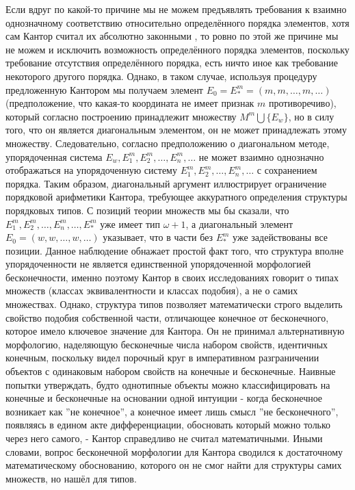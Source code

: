 \documentclass[12pt]{article}
\begin{document}
Если вдруг по какой-то причине мы не можем предъявлять требования к взаимно однозначному соответствию относительно определённого порядка элементов, хотя сам Кантор считал их абсолютно законными \cite{cantor-relation}, то ровно по этой же причине мы не можем и исключить возможность определённого порядка элементов, поскольку требование отсутствия определённого порядка, есть ничто иное как требование некоторого другого порядка. Однако, в таком случае, используя процедуру предложенную Кантором мы получаем элемент $E_0 = E^m_* = (m, m, \dots, m, \dots)$ (предположение, что какая-то координата не имеет признак $m$ противоречиво), который согласно построению принадлежит множеству $M^m \bigcup \{E_w\}$, но в силу того, что он является диагональным элементом, он не может принадлежать этому множеству. Следовательно, согласно предположению о диагональном методе, упорядоченная система $E_w, E^m_1, E^m_2, \dots, E^m_n, \dots$ не может взаимно однозначно отображаться на упорядоченную систему $E^m_1, E^m_2, \dots, E^m_n, \dots$ с сохранением порядка. Таким образом, диагональный аргумент иллюстрирует ограничение порядковой арифметики Кантора, требующее аккуратного определения структуры порядковых типов. С позиций теории множеств мы бы сказали, что $E^m_1, E^m_2, \dots, E^m_n, \dots, E^m_*$ уже имеет тип $\omega + 1$, а диагональный элемент $E_0 = (w, w, \dots, w, \dots)$ указывает, что в части без $E^m_*$ уже задействованы все позиции. Данное наблюдение обнажает простой факт того, что структура вполне упорядоченности не является единственной упорядоченной морфологией бесконечности, именно поэтому Кантор в своих исследованиях говорит о типах множеств (классах эквивалентности и классах подобия), а не о самих множествах. Однако, структура типов позволяет математически строго выделить свойство подобия собственной части, отличающее конечное от бесконечного, которое имело ключевое значение для Кантора. Он не принимал альтернативную морфологию, наделяющую бесконечные числа набором свойств, идентичных конечным, поскольку видел порочный круг в императивном разграничении объектов с одинаковым набором свойств на конечные и бесконечные. Наивные попытки утверждать, будто однотипные объекты можно классифицировать на конечные и бесконечные на основании одной интуиции - когда бесконечное возникает как ''не конечное'', а конечное имеет лишь смысл ''не бесконечного'', появляясь в едином акте дифференциации, обосновать который можно только через него самого, - Кантор справедливо не считал математичными. Иными словами, вопрос бесконечной морфологии для Кантора сводился к достаточному математическому обоснованию, которого он не смог найти для структуры самих множеств, но нашёл для типов.
\end{document}
